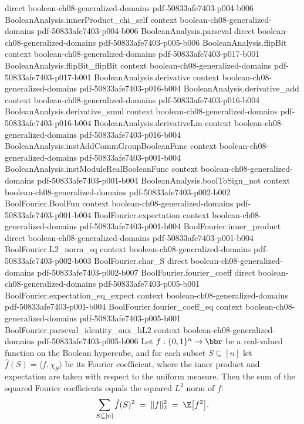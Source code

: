 \begin{lemma}
  {direct}
  {boolean-ch08-generalized-domains}
  {pdf-50833afe7403-p004-b006}
\proofstep
  {BooleanAnalysis.innerProduct_chi_self}
  {context}
  {boolean-ch08-generalized-domains}
  {pdf-50833afe7403-p004-b006}
\proofstep
  {BooleanAnalysis.parseval}
  {direct}
  {boolean-ch08-generalized-domains}
  {pdf-50833afe7403-p005-b006}
\proofstep
  {BooleanAnalysis.flipBit}
  {context}
  {boolean-ch08-generalized-domains}
  {pdf-50833afe7403-p017-b001}
\proofstep
  {BooleanAnalysis.flipBit_flipBit}
  {context}
  {boolean-ch08-generalized-domains}
  {pdf-50833afe7403-p017-b001}
\proofstep
  {BooleanAnalysis.derivative}
  {context}
  {boolean-ch08-generalized-domains}
  {pdf-50833afe7403-p016-b004}
\proofstep
  {BooleanAnalysis.derivative_add}
  {context}
  {boolean-ch08-generalized-domains}
  {pdf-50833afe7403-p016-b004}
\proofstep
  {BooleanAnalysis.derivative_smul}
  {context}
  {boolean-ch08-generalized-domains}
  {pdf-50833afe7403-p016-b004}
\proofstep
  {BooleanAnalysis.derivativeLm}
  {context}
  {boolean-ch08-generalized-domains}
  {pdf-50833afe7403-p016-b004}
\proofstep
  {BooleanAnalysis.instAddCommGroupBooleanFunc}
  {context}
  {boolean-ch08-generalized-domains}
  {pdf-50833afe7403-p001-b004}
\proofstep
  {BooleanAnalysis.instModuleRealBooleanFunc}
  {context}
  {boolean-ch08-generalized-domains}
  {pdf-50833afe7403-p001-b004}
\proofstep
  {BooleanAnalysis.boolToSign_not}
  {context}
  {boolean-ch08-generalized-domains}
  {pdf-50833afe7403-p002-b002}
\proofstep
  {BoolFourier.BoolFun}
  {context}
  {boolean-ch08-generalized-domains}
  {pdf-50833afe7403-p001-b004}
\proofstep
  {BoolFourier.expectation}
  {context}
  {boolean-ch08-generalized-domains}
  {pdf-50833afe7403-p001-b004}
\proofstep
  {BoolFourier.inner_product}
  {direct}
  {boolean-ch08-generalized-domains}
  {pdf-50833afe7403-p001-b004}
\proofstep
  {BoolFourier.L2_norm_sq}
  {context}
  {boolean-ch08-generalized-domains}
  {pdf-50833afe7403-p002-b003}
\proofstep
  {BoolFourier.char_S}
  {direct}
  {boolean-ch08-generalized-domains}
  {pdf-50833afe7403-p002-b007}
\proofstep
  {BoolFourier.fourier_coeff}
  {direct}
  {boolean-ch08-generalized-domains}
  {pdf-50833afe7403-p005-b001}
\proofstep
  {BoolFourier.expectation_eq_expect}
  {context}
  {boolean-ch08-generalized-domains}
  {pdf-50833afe7403-p001-b004}
\proofstep
  {BoolFourier.fourier_coeff_eq}
  {context}
  {boolean-ch08-generalized-domains}
  {pdf-50833afe7403-p005-b001}
\proofstep
  {BoolFourier.parseval_identity_aux_hL2}
  {context}
  {boolean-ch08-generalized-domains}
  {pdf-50833afe7403-p005-b006}
Let $f : \{0,1\}^n \to \bbr$ be a real-valued function on the Boolean hypercube, and for
each subset $S \subseteq [n]$ let $\hat f(S) = \langle f, \chi_S\rangle$ be its Fourier
coefficient, where the inner product and expectation are taken with respect to the
uniform measure. Then the sum of the squared Fourier coefficients equals the squared
$L^2$ norm of $f$:
\[
  \sum_{S \subseteq [n]} \hat f(S)^2 \;=\; \|f\|_2^2 \;=\; \E\bigl[f^2\bigr].
\]
\end{lemma}

